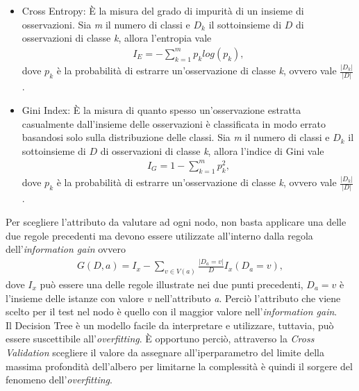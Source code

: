 \begin{itemize}
	\item Cross Entropy: È la misura del grado di impurità di un insieme di osservazioni. Sia \emph{m} il numero di classi e $D_k$ il sottoinsieme di $D$ di osservazioni di classe \emph{k}, allora l'entropia vale
	\begin{align*}
		I_E =	- \sum_{k=1}^{m} p_k log(p_k),
	\end{align*} 
	dove $p_k$ è la probabilità di estrarre un'osservazione di classe \emph{k}, ovvero vale $\frac{|D_k|}{|D|}$.
	\item Gini Index: È la misura di quanto spesso un'osservazione estratta casualmente dall'insieme delle osservazioni è classificata in modo errato basandosi solo sulla distribuzione delle classi. Sia \emph{m} il numero di classi e $D_k$ il sottoinsieme di $D$ di osservazioni di classe \emph{k}, allora l'indice di Gini vale
	\begin{align*}
		I_G = 1 - \sum_{k=1}^{m} p_{k}^2,
	\end{align*} 
	dove $p_k$ è la probabilità di estrarre un'osservazione di classe \emph{k}, ovvero vale $\frac{|D_k|}{|D|}$.
\end{itemize}
Per scegliere l'attributo da valutare ad ogni nodo, non basta applicare una delle due regole precedenti ma devono essere utilizzate all'interno dalla regola dell'\emph{information gain} ovvero
\begin{align*}
	G(D,a) = I_x - \sum_{v\in V(a)} \frac{|D_a = v|}{D}I_x(D_a=v),
\end{align*} 
dove $I_x$ può essere una delle regole illustrate nei due punti precedenti, $D_a=v$ è l'insieme delle istanze con valore \emph{v} nell'attributo \emph{a}.
Perciò l'attributo che viene scelto per il test nel nodo è quello con il maggior valore nell'\emph{information gain}.\\
Il Decision Tree è un modello facile da interpretare e utilizzare, tuttavia, può essere suscettibile all'\emph{overfitting}. È opportuno perciò, attraverso la \emph{Cross Validation} scegliere il valore da assegnare all'iperparametro del limite della massima profondità dell'albero per limitarne la complessità è quindi il sorgere del fenomeno dell'\emph{overfitting}.

